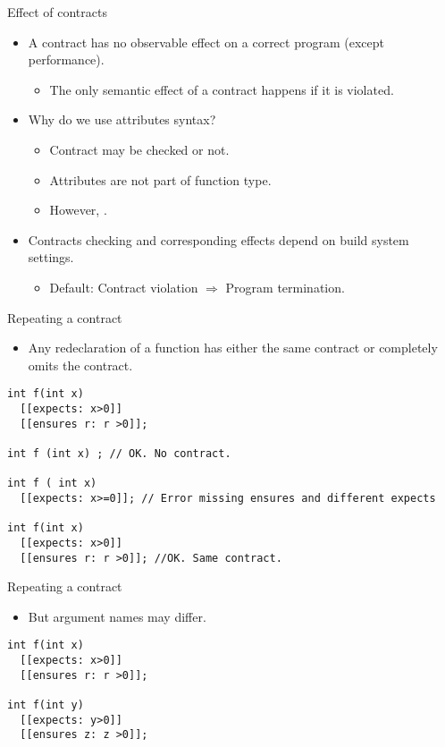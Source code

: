 \begin{frame}[t]{Effect of contracts}
\begin{itemize}
  \item A contract has no observable effect on a correct program (except
performance).
    \begin{itemize}
      \item The only semantic effect of a contract happens if it is violated.
    \end{itemize}

  \vfill\pause
  \item Why do we use attributes syntax?
    \begin{itemize}
      \item Contract may be checked or not.
      \item Attributes are not part of function type.
      \item However, .
    \end{itemize}

  \vfill\pause
  \item Contracts checking and corresponding effects depend on build system
settings.
    \begin{itemize}
      \item Default: Contract violation $\Rightarrow$ Program
termination.
    \end{itemize}
\end{itemize}
\end{frame}

\begin{frame}[t,fragile]{Repeating a contract}
\begin{itemize}
  \item Any redeclaration of a function has either the same contract or
completely omits the contract.
\end{itemize}
\vfill\pause
\begin{lstlisting}
int f(int x)
  [[expects: x>0]]
  [[ensures r: r >0]];

int f (int x) ; // OK. No contract.

int f ( int x)
  [[expects: x>=0]]; // Error missing ensures and different expects

int f(int x)
  [[expects: x>0]]
  [[ensures r: r >0]]; //OK. Same contract.
\end{lstlisting}
\end{frame}

\begin{frame}[t,fragile]{Repeating a contract}
\begin{itemize}
  \item But argument names may differ.
\end{itemize}

\vfill\pause
\begin{lstlisting}
int f(int x)
  [[expects: x>0]]
  [[ensures r: r >0]];

int f(int y)
  [[expects: y>0]]
  [[ensures z: z >0]];


\end{lstlisting}
\end{frame}

